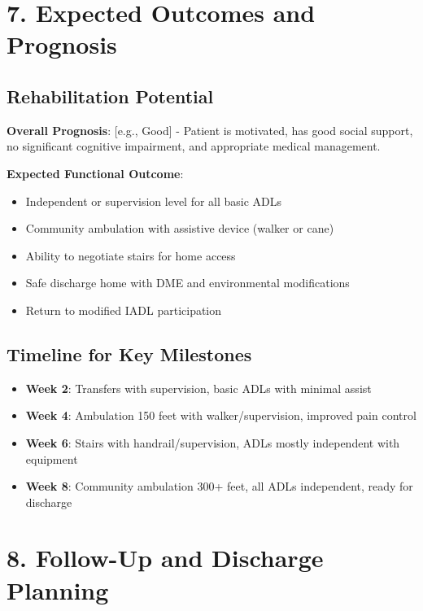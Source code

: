 \documentclass[11pt,letterpaper]{article}
\begin{document}
\section*{7. Expected Outcomes and Prognosis}

\subsection*{Rehabilitation Potential}

\textbf{Overall Prognosis}: [e.g., Good] - Patient is motivated, has good social support, no significant cognitive impairment, and appropriate medical management.

\textbf{Expected Functional Outcome}:
\begin{itemize}[leftmargin=*]
    \item Independent or supervision level for all basic ADLs
    \item Community ambulation with assistive device (walker or cane)
    \item Ability to negotiate stairs for home access
    \item Safe discharge home with DME and environmental modifications
    \item Return to modified IADL participation
\end{itemize}

\subsection*{Timeline for Key Milestones}

\begin{itemize}[leftmargin=*]
    \item \textbf{Week 2}: Transfers with supervision, basic ADLs with minimal assist
    \item \textbf{Week 4}: Ambulation 150 feet with walker/supervision, improved pain control
    \item \textbf{Week 6}: Stairs with handrail/supervision, ADLs mostly independent with equipment
    \item \textbf{Week 8}: Community ambulation 300+ feet, all ADLs independent, ready for discharge
\end{itemize}

\section*{8. Follow-Up and Discharge Planning}
\end{document}
